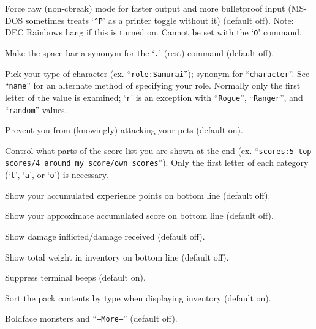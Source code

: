 \item[\ib{rawio}]
Force raw (non-cbreak) mode for faster output and more
bulletproof input (MS-DOS sometimes treats `{\tt \^{}P}' as a printer toggle
without it) (default off).  Note:  DEC Rainbows hang if this is turned on.
Cannot be set with the `{\tt O}' command.

\item[\ib{rest\_on\_space}]
Make the space bar a synonym for the `{\tt .}' (rest) command (default off).

\item[\ib{role}]
Pick your type of character (ex. ``{\tt role:Samurai}'');
synonym for ``{\tt character}''.  See ``{\tt name}'' for an alternate method
of specifying your role.  Normally only the first letter of the
value is examined; `{\tt r}' is an exception with ``{\tt Rogue}'', ``{\tt Ranger}'',
and ``{\tt random}'' values.

\item[\ib{safe\_pet}]
Prevent you from (knowingly) attacking your pets (default on).

\item[\ib{scores}]
Control what parts of the score list you are shown at the end (ex.
``{\tt scores:5 top scores/4 around my score/own scores}'').  Only the first
letter of each category (`{\tt t}', `{\tt a}', or `{\tt o}') is necessary.

\item[\ib{showexp}]
Show your accumulated experience points on bottom line (default off).

\item[\ib{showscore}]
Show your approximate accumulated score on bottom line (default off).

\item[\ib{showdmg}]
Show damage inflicted/damage received (default off).

\item[\ib{showweight}]
Show total weight in inventory on bottom line (default off).

\item[\ib{silent}]
Suppress terminal beeps (default on).

\item[\ib{sortpack}]
Sort the pack contents by type when displaying inventory (default on).

\item[\ib{standout}]
Boldface monsters and ``{\tt --More--}'' (default off).

